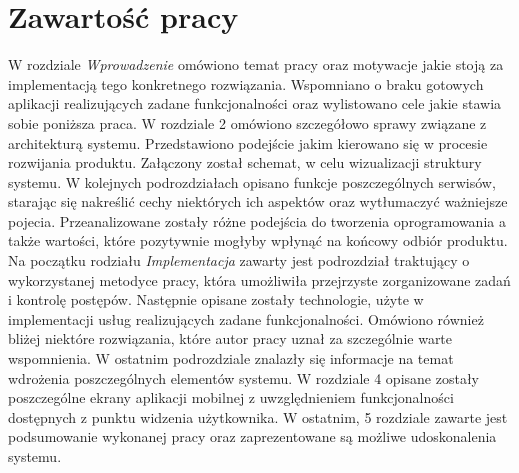 \section{Zawartość pracy}
\label{sec:zawartoscPracy}
W rozdziale \textit{Wprowadzenie} omówiono temat pracy oraz motywacje jakie stoją za implementacją tego konkretnego rozwiązania. Wspomniano o braku gotowych aplikacji realizujących zadane funkcjonalności oraz wylistowano cele jakie stawia sobie poniższa praca.\newline
W rozdziale 2 omówiono szczegółowo sprawy związane z architekturą systemu. Przedstawiono podejście jakim kierowano się w procesie rozwijania produktu. Załączony został schemat, w celu wizualizacji struktury systemu. W kolejnych podrozdziałach opisano funkcje poszczególnych serwisów, starając się nakreślić cechy niektórych ich aspektów oraz wytłumaczyć ważniejsze pojecia. Przeanalizowane zostały różne podejścia do tworzenia oprogramowania a także wartości, które pozytywnie mogłyby wpłynąć na końcowy odbiór produktu.\newline
Na początku rodziału \textit{Implementacja} zawarty jest podrozdział traktujący o wykorzystanej metodyce pracy, która umożliwiła przejrzyste zorganizowane zadań i kontrolę postępów. Następnie opisane zostały technologie, użyte w implementacji usług realizujących zadane funkcjonalności. Omówiono również bliżej niektóre rozwiązania, które autor pracy uznał za szczególnie warte wspomnienia. W ostatnim podrozdziale znalazły się informacje na temat wdrożenia poszczególnych elementów systemu.\newline
W rozdziale 4 opisane zostały poszczególne ekrany aplikacji mobilnej z uwzględnieniem funkcjonalności dostępnych z punktu widzenia użytkownika.\newline
W ostatnim, 5 rozdziale zawarte jest podsumowanie wykonanej pracy oraz zaprezentowane są możliwe udoskonalenia systemu.
